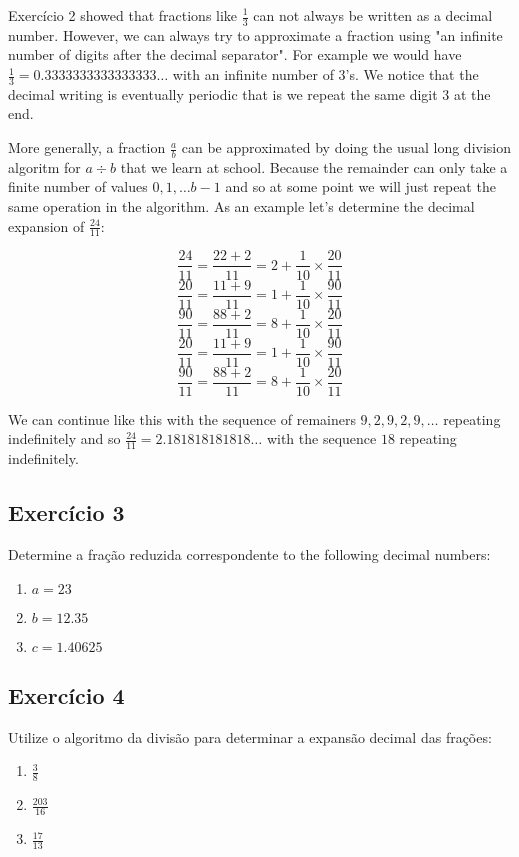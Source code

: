 Exercício 2 showed that fractions like $\frac{1}{3}$ can not always be
written as a decimal number. However, we can always try to approximate
a fraction using "an infinite number of digits after the decimal separator".
For example we would have $\frac{1}{3} = 0.3333333333333333 \dots$ with an
infinite number of $3$'s. We notice that the decimal writing is eventually
periodic that is we repeat the same digit $3$ at the end.

More generally, a fraction $\frac{a}{b}$ can be approximated by doing the usual
long division algoritm for $a \div b$ that we learn at school.
Because the remainder can only take a finite number of values
$0, 1, \dots {b-1}$ and so at some point we will just repeat the same operation
in the algorithm. As an example let's determine the decimal expansion of
$\frac{24}{11}$:

$$\frac{24}{11} = \frac{22+2}{11} =
2 + \frac{1}{10} \times \frac{20}{11}$$
$$\frac{20}{11} = \frac{11+9}{11}  = 1 + \frac{1}{10} \times \frac{90}{11}$$
$$\frac{90}{11} = \frac{88+2}{11}  = 8 + \frac{1}{10} \times \frac{20}{11}$$
$$\frac{20}{11} = \frac{11+9}{11}  = 1 + \frac{1}{10} \times \frac{90}{11}$$
$$\frac{90}{11} = \frac{88+2}{11}  = 8 + \frac{1}{10} \times \frac{20}{11}$$

We can continue like this with the sequence of remainers $9,2,9,2,9,\ldots$
repeating indefinitely and so $\frac{24}{11} = 2.181818181818\ldots$ with the
sequence $18$ repeating indefinitely.

\subsection*{Exercício 3}

Determine a fração reduzida correspondente to the following decimal numbers:

\begin{enumerate}
\item $a = 23$
\item $b = 12.35$
\item $c = 1.40625$
\end{enumerate}

\subsection*{Exercício 4}

Utilize o algoritmo da divisão para determinar a expansão decimal das frações:

\begin{enumerate}
\item $\frac{3}{8}$
\item $\frac{203}{16}$
\item $\frac{17}{13}$
\end{enumerate}

